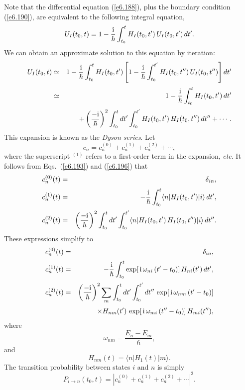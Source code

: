 Note that the differential equation (\ref{e6.188}), plus the boundary condition
(\ref{e6.190}), are equivalent to the following integral equation,
\begin{equation}
U_I(t_0, t) = 1 - \frac{\rm i}{\hbar} \int_{t_0}^t H_I(t_0, t')\,
U_I(t_0, t') \,dt'.
\end{equation}
We can obtain an approximate solution to this equation by iteration:
\begin{eqnarray}
U_I(t_0, t) &\simeq& 1 - \frac{\rm i}{\hbar} \int_{t_0}^t H_I(t_0, t')
\left[ 1 - \frac{\rm i}{\hbar} \int_{t_0}^{t'} H_I(t_0, t'')\,
U_I(t_0, t'')\right] dt'\nonumber \\[0.5ex]
&\simeq& 1 - \frac{\rm i}{\hbar} \int_{t_0}^t H_I(t_0, t')\,dt'\nonumber\\[0.5ex]
&& + \left(\frac{-{\rm i}}{\hbar}\right)^2 \int_{t_0}^t dt'
\int_{t_0}^{t'}  H_I(t_0, t' )\,H_I(t_0, t'' )\, dt'' + \cdots.\label{e6.196}
\end{eqnarray}
This expansion is known as the {\em Dyson series}.
Let 
\begin{equation}
c_n = c_n^{(0)} + c_n^{(1)} + c_n^{(2)} + \cdots,
\end{equation}
where the superscript $^{(1)}$ refers to a first-order term in the expansion,
{\em etc}. It follows from Eqs.~(\ref{e6.193}) and (\ref{e6.196}) that 
\begin{eqnarray}
c_n^{(0)}(t) &=& \delta_{in},\\[0.5ex]
c_n^{(1)}(t) &=& -\frac{\rm i}{\hbar} \int_{t_0}^t \langle n |H_I(t_0, t')|i\rangle\,
dt',\\[0.5ex]
c_n^{(2)}(t) &=& \left(\frac{-{\rm i}}{\hbar}\right)^2 \int_{t_0}^t dt'
\int_{t_0}^{t'} \langle n|  H_I(t_0, t' )\,H_I(t_0, t'' )|i\rangle\,dt''.
\end{eqnarray}
These expressions simplify to
\begin{eqnarray}\label{e6.201}
c_n^{(0)}(t) &=& \delta_{in},\\[0.5ex]\label{e6.202}
c_n^{(1)}(t) &=& -\frac{\rm i}{\hbar} \int_{t_0}^t \exp[\,{\rm i} \,\omega_{ni}\,
(t'-t_0)]\, H_{ni}(t') \,dt', \\[0.5ex]
c_n^{(2)}(t) &=& \left(\frac{-{\rm i}}{\hbar}\right)^2
\sum_m \int_{t_0}^t dt'\int_{t_0}^{t' }dt''\,\exp[\,{\rm i}
 \,\omega_{nm}\,(t'-t_0)]\nonumber\\[0.5ex]
 &&\times  H_{nm}(t') \,
\exp[\,{\rm i} \,\omega_{mi}\,(t''-t_0)]\,H_{mi}(t''),\label{e6.203}
\end{eqnarray}
where
\begin{equation}
\omega_{nm} = \frac{E_n -E_m}{\hbar},
\end{equation}
and
\begin{equation}
H_{nm} (t) = \langle n| H_1(t) | m\rangle.
\end{equation}
The transition probability between states $i$ and $n$ is
simply
\begin{equation}
P_{i\rightarrow n} (t_0, t) = |c_n^{(0)} + c_n^{(1)} + c_n^{(2)} +\cdots|^2.
\end{equation}

